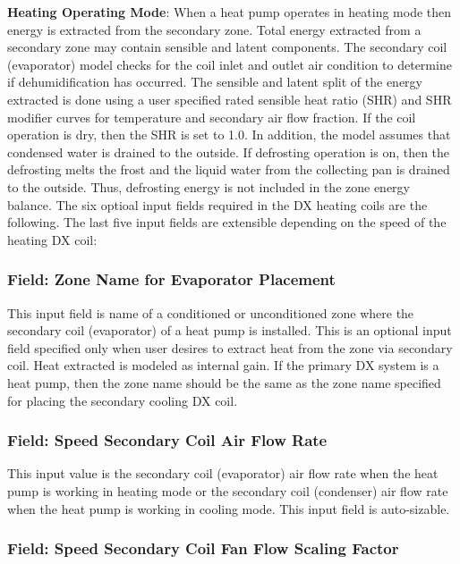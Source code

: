 \textbf{Heating Operating Mode}: When a heat pump operates in heating mode then energy is extracted from the secondary zone. Total energy extracted from a secondary zone may contain sensible and latent components. The secondary coil (evaporator) model checks for the coil inlet and outlet air condition to determine if dehumidification has occurred. The sensible and latent split of the energy extracted is done using a user specified rated sensible heat ratio (SHR) and SHR modifier curves for temperature and secondary air flow fraction. If the coil operation is dry, then the SHR is set to 1.0. In addition, the model assumes that condensed water is drained to the outside. If defrosting operation is on, then the defrosting melts the frost and the liquid water from the collecting pan is drained to the outside. Thus, defrosting energy is not included in the zone energy balance. The six optioal input fields required in the DX heating coils are the following. The last five input fields are extensible depending on the speed of the heating DX coil:

\subsubsection{Field: Zone Name for Evaporator Placement}\label{field-zone-name-for-evaporator-placement-2}

This input field is name of a conditioned or unconditioned zone where the secondary coil (evaporator) of a heat pump is installed. This is an optional input field specified only when user desires to extract heat from the zone via secondary coil. Heat extracted is modeled as internal gain. If the primary DX system is a heat pump, then the zone name should be the same as the zone name specified for placing the secondary cooling DX coil.

\subsubsection{\texorpdfstring{Field: Speed Secondary Coil Air Flow Rate}{Field: Speed  Secondary Coil Air Flow Rate}}\label{field-speed-secondary-coil-air-flow-rate}

This input value is the secondary coil (evaporator) air flow rate when the heat pump is working in heating mode or the secondary coil (condenser) air flow rate when the heat pump is working in cooling mode. This input field is auto-sizable.

\subsubsection{\texorpdfstring{Field: Speed Secondary Coil Fan Flow Scaling Factor}{Field: Speed  Secondary Coil Fan Flow Scaling Factor}}\label{field-speed-secondary-coil-fan-flow-scaling-factor}

